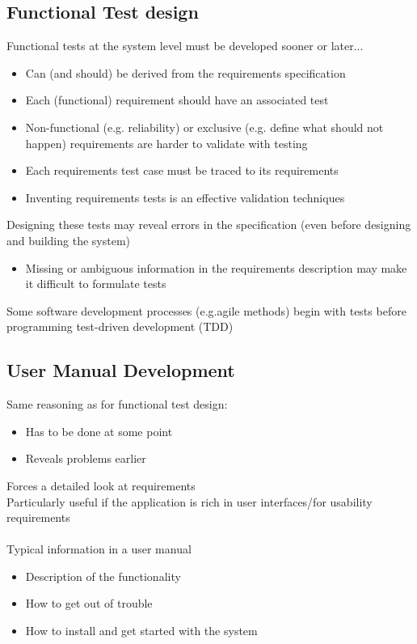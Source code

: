 \documentclass{article}[18pt]
\begin{document}
\subsection{Functional Test design}
Functional tests at the system level must be developed sooner or later...
\begin{itemize}
	\item Can (and should) be derived from the requirements specification
	\item Each (functional) requirement should have an associated test
	\item Non-functional (e.g. reliability) or exclusive (e.g. define what should not happen) requirements are harder to validate with testing
	\item Each requirements test case must be traced to its requirements
	\item Inventing requirements tests is an effective validation techniques
\end{itemize}
Designing these tests may reveal errors in the specification (even before designing and building the system)
\begin{itemize}
	\item Missing or ambiguous information in the requirements description may make it difficult to formulate tests
\end{itemize}
Some software development processes (e.g.agile methods) begin with tests before programming test-driven development (TDD)
\subsection{User Manual Development}
Same reasoning as for functional test design:
\begin{itemize}
	\item Has to be done at some point
	\item Reveals problems earlier
\end{itemize}
Forces a detailed look at requirements\\
Particularly useful if the application is rich in user interfaces/for usability requirements\\
\\
Typical information in a user manual
\begin{itemize}
	\item Description of the functionality
	\item How to get out of trouble
	\item How to install and get started with the system
\end{itemize}
\end{document}
